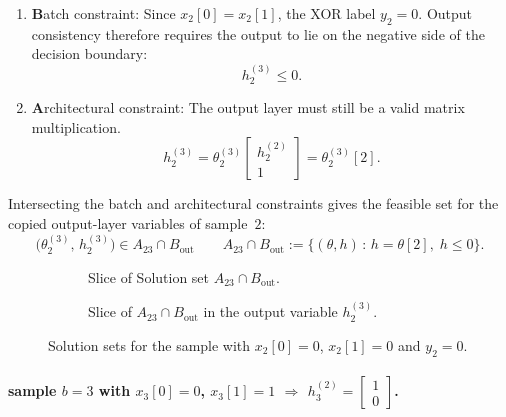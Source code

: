 \begin{enumerate}
  \item \textbf{B}atch constraint: Since $x_2[0]=x_2[1]$, the XOR label $y_2=0$. Output consistency therefore requires the output to lie on the negative side of the decision boundary:
\begin{equation*}
h_2^{(3)} \le 0.
\end{equation*}

\item \textbf{A}rchitectural constraint: The output layer must still be a valid matrix multiplication.
\begin{equation*}
h_2^{(3)} = \theta_2^{(3)}  \begin{bmatrix} h_2^{(2)} \\ 1 \end{bmatrix}
= \theta_2^{(3)}[2].
\end{equation*}
\end{enumerate}
Intersecting the batch and architectural
constraints gives the feasible set for the copied output-layer variables of
sample~$2$:
\begin{equation*}
  \bigl(\theta_2^{(3)},\, h_2^{(3)}\bigr) \in A_{23}  \cap B_{\mathrm{out}} \qquad
  A_{23}  \cap B_{\mathrm{out}} := \bigl\{(\theta,h) \,:\, h = \theta[2],\; h \le 0\bigr\}.
\end{equation*}
\begin{figure}[h]
\centering
\begin{subfigure}[t]{0.48\textwidth}
\centering

\caption{Slice of Solution set $A_{23}  \cap B_{\mathrm{out}}$.}
\label{fig:xor_constraints_wb_only}
\end{subfigure}
\hfill
\begin{subfigure}[t]{0.48\textwidth}
\centering

\caption{Slice of $A_{23}  \cap B_{\mathrm{out}}$ in the output variable $h_2^{(3)}$.}
\label{fig:xor_accepted_wb_neg_label}
\end{subfigure}
\caption{Solution sets for the sample with $x_2[0]=0$, $x_2[1]=0$ and $y_2=0$.}
\label{fig:xor_output_relation_wb_only}
\end{figure}

\paragraph{sample $b=3$ with $x_3[0]=0$, $x_3[1]=1$ $\Rightarrow$
$h_3^{(2)} =\begin{bmatrix} 1 \\ 0 \end{bmatrix}$.}

